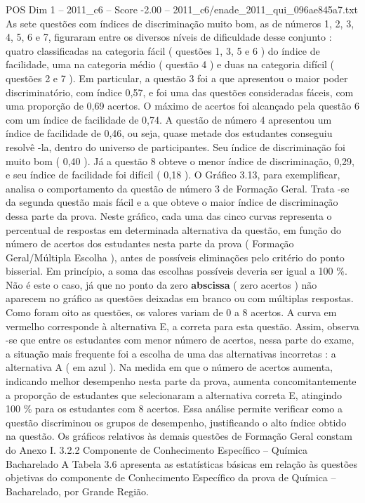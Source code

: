 \begin{textsample}{POS Dim 1 – 2011\_c6 – Score -2.00 – 2011\_c6/enade\_2011\_qui\_096ae845a7.txt}
As sete questões com índices de discriminação muito bom, as de números 1, 2, 3, 4, 5, 6 e 7, figuraram entre os diversos níveis de dificuldade desse conjunto : quatro classificadas na categoria fácil ( questões 1, 3, 5 e 6 ) do índice de facilidade, uma na categoria médio ( questão 4 ) e duas na categoria difícil ( questões 2 e 7 ).
Em particular, a questão 3 foi a que apresentou o maior poder discriminatório, com índice 0,57, e foi uma das questões consideradas fáceis, com uma proporção de 0,69 acertos.
O máximo de acertos foi alcançado pela questão 6 com um índice de facilidade de 0,74.
A questão de número 4 apresentou um índice de facilidade de 0,46, ou seja, quase metade dos estudantes conseguiu resolvê -la, dentro do universo de participantes.
Seu índice de discriminação foi muito bom ( 0,40 ).
Já a questão 8 obteve o menor índice de discriminação, 0,29, e seu índice de facilidade foi difícil ( 0,18 ).
O Gráfico 3.13, para exemplificar, analisa o comportamento da questão de número 3 de Formação Geral.
Trata -se da segunda questão mais fácil e a que obteve o maior índice de discriminação dessa parte da prova.
Neste gráfico, cada uma das cinco curvas representa o percentual de respostas em determinada alternativa da questão, em função do número de acertos dos estudantes nesta parte da prova ( Formação Geral/Múltipla Escolha ), antes de possíveis eliminações pelo critério do ponto bisserial.
Em princípio, a soma das escolhas possíveis deveria ser igual a 100 \%.
Não é este o caso, já que no ponto da zero \textbf{abscissa} ( zero acertos ) não aparecem no gráfico as questões deixadas em branco ou com múltiplas respostas.
Como foram oito as questões, os valores variam de 0 a 8 acertos.
A curva em vermelho corresponde à alternativa E, a correta para esta questão.
Assim, observa -se que entre os estudantes com menor número de acertos, nessa parte do exame, a situação mais frequente foi a escolha de uma das alternativas incorretas : a alternativa A ( em azul ).
Na medida em que o número de acertos aumenta, indicando melhor desempenho nesta parte da prova, aumenta concomitantemente a proporção de estudantes que selecionaram a alternativa correta E, atingindo 100 \% para os estudantes com 8 acertos.
Essa análise permite verificar como a questão discriminou os grupos de desempenho, justificando o alto índice obtido na questão.
Os gráficos relativos às demais questões de Formação Geral constam do Anexo I. 3.2.2 Componente de Conhecimento Específico – Química Bacharelado A Tabela 3.6 apresenta as estatísticas básicas em relação às questões objetivas do componente de Conhecimento Específico da prova de Química – Bacharelado, por Grande Região.

\end{textsample}
